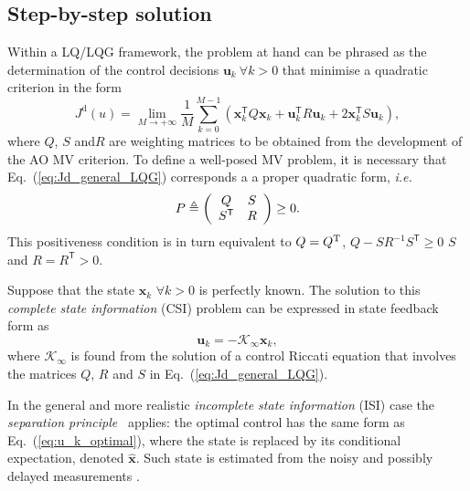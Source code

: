 \documentclass[a4paper,12pt]{article}
\newcommand{\T}{\mathsf{T}} %
\newcommand{\0}{\mathsf{0}} %
\newcommand{\K}{\mathcal{K}_{\infty}} %
\newcommand{\xvec}{{\mathbf{x}}}
\newcommand{\uvec}{{\mathbf{u}}}
\begin{document}
\subsection{Step-by-step solution }

   
        Within a LQ/LQG framework, the problem at hand can be phrased
        as the determination of the control 
        decisions $\uvec_k~\forall k>0$ that minimise a quadratic
        criterion in the form
        \begin{equation}\label{eq:Jd_general_LQG}
          J^\mathrm{d}\left(  u\right)
          =\lim_{M\rightarrow+\infty}\frac{1}{M}\sum_{k=0}^{M-1}\left(
             \xvec_{k}^{\T}Q
            \xvec_{k}+\uvec_{k}^{\T}R \uvec_{k}+2\xvec_{k}^{\T}S \uvec_{k}\right) ,
        \end{equation}
        where $Q$, $S$ and$ R$ are weighting matrices
        to be obtained from the development of the AO MV criterion. To define
        a well-posed MV problem, it is necessary that
        Eq.~(\ref{eq:Jd_general_LQG}) corresponds a a proper
        quadratic form, \emph{i.e.}
          \begin{equation}\label{lq_wheigh_matrices}
            P\triangleq\left(
              \begin{array}
                [c]{cc}%
                Q &  S\\
                 S^{\T} &  R
              \end{array}
            \right)  \geq 0.
          \end{equation} 
        This positiveness condition is in turn equivalent to $Q=Q^{\text
          T}$, $Q-SR^{-1}S^{\T}\geq0$ $S$ and $R=R^{\T}>0$.

        Suppose that the  state $\xvec_k$  $\forall
        k>0$ is perfectly known.  
        The solution to this \emph{complete state information} (CSI)
        problem can be expressed in state feedback form as
        \begin{equation}\label{eq:u_k_optimal}
          \uvec_k = -\K\xvec_k ,
        \end{equation}
        where $\K$ is found from the solution of
        a control Riccati equation that involves the matrices $Q$, $R$
        and $S$ in Eq.~(\ref{eq:Jd_general_LQG}).

        In the general and more realistic \emph{incomplete state
          information} (ISI) case the \emph{separation
          principle}~\cite{barshalom74,andersonmoore_optimalcontrolLQG05}
        applies: the optimal control has the same form as 
        Eq.~(\ref{eq:u_k_optimal}), where the state is replaced by its
        conditional expectation, denoted $\widehat{\xvec}$. Such state is
        estimated from the noisy and possibly delayed measurements%
        . 
        
\end{document}
